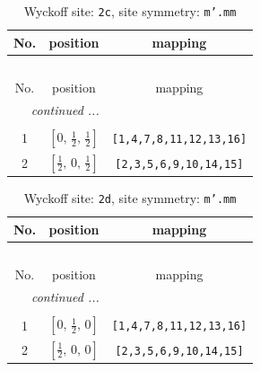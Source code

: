 \documentclass[fleqn,8pt]{jsarticle}
\begin{document}
\renewcommand{\arraystretch}{1.2}
\begin{longtable}{ccc}
\caption{Wyckoff site: {\tt 2c}, site symmetry: {\tt m'.mm}}
 \\
 \hline \hline
No. & position & mapping \\ \hline \endfirsthead

\multicolumn{2}{l}{\tablename\ \thetable{}} \\
 \hline \hline
No. & position & mapping \\ \hline \endhead

 \hline \hline
\multicolumn{2}{r}{\footnotesize\it continued ...} \\ \endfoot

 \hline \hline
\multicolumn{2}{r}{} \\ \endlastfoot

1 & $\left[ 0,\, \frac{1}{2},\, \frac{1}{2} \right]$ & {\tt [1,4,7,8,11,12,13,16]} \\ \hline
2 & $\left[ \frac{1}{2},\, 0,\, \frac{1}{2} \right]$ & {\tt [2,3,5,6,9,10,14,15]} \\
\end{longtable}
\renewcommand{\arraystretch}{1.2}
\begin{longtable}{ccc}
\caption{Wyckoff site: {\tt 2d}, site symmetry: {\tt m'.mm}}
 \\
 \hline \hline
No. & position & mapping \\ \hline \endfirsthead

\multicolumn{2}{l}{\tablename\ \thetable{}} \\
 \hline \hline
No. & position & mapping \\ \hline \endhead

 \hline \hline
\multicolumn{2}{r}{\footnotesize\it continued ...} \\ \endfoot

 \hline \hline
\multicolumn{2}{r}{} \\ \endlastfoot

1 & $\left[ 0,\, \frac{1}{2},\, 0 \right]$ & {\tt [1,4,7,8,11,12,13,16]} \\ \hline
2 & $\left[ \frac{1}{2},\, 0,\, 0 \right]$ & {\tt [2,3,5,6,9,10,14,15]} \\
\end{longtable}
\renewcommand{\arraystretch}{1.2}
\end{document}
